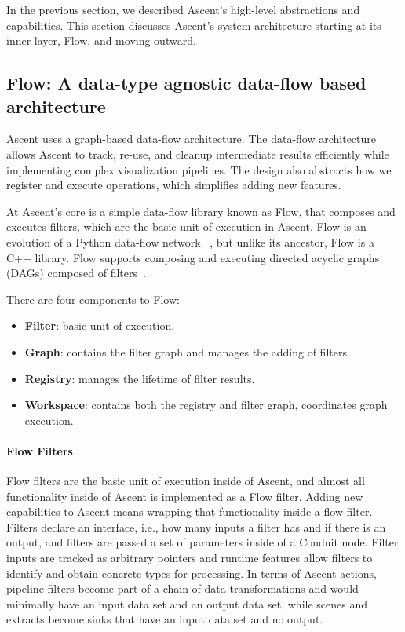 In the previous section, we described Ascent's high-level abstractions and
capabilities.
%
This section discusses Ascent's system architecture starting at its inner layer, Flow,
and moving outward.

\subsection{Flow: A data-type agnostic data-flow based architecture}
\label{sec:flow}
Ascent uses a graph-based data-flow architecture.
The data-flow architecture allows Ascent to track, re-use, and cleanup intermediate
results efficiently while implementing complex visualization pipelines.
The design also abstracts how we register and execute operations,
which simplifies adding new features.

At Ascent's core is a simple data-flow library known as Flow, that
composes and executes filters, which are the basic unit of execution in Ascent.
%
Flow is an evolution of a Python data-flow network
~\cite{flow_reference}, but unlike its ancestor, Flow is a C++
library.
%
Flow supports composing and executing directed acyclic graphs
(DAGs) composed of filters~\cite{LarsenAscent}.

There are four components to Flow:
\begin{itemize}
  \item \textbf{Filter}: basic unit of execution.
  \item \textbf{Graph}: contains the filter graph and manages the adding of
filters.
  \item \textbf{Registry}: manages the lifetime of filter results.
  \item \textbf{Workspace}: contains both the registry and filter graph,
coordinates graph execution.
\end{itemize}

\paragraph{Flow Filters}
Flow filters are the basic unit of execution inside of Ascent, and
almost all functionality inside of Ascent is implemented as a Flow filter.
%
Adding new capabilities to Ascent means wrapping that functionality inside
a flow filter.
%
Filters declare an interface, i.e., how many inputs a filter has and
if there is an output, and filters are passed a set of parameters inside
of a Conduit
node.
%
Filter inputs are tracked as arbitrary pointers and runtime features allow
filters to identify and obtain concrete types for processing.
%
In terms of Ascent actions, pipeline filters become part of a chain of
data transformations and would minimally have an input
data set and an output data set, while scenes and extracts
become sinks that have an input data set and no output.
%

